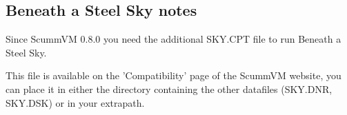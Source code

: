 \subsection{Beneath a Steel Sky notes}
Since ScummVM 0.8.0 you need the additional SKY.CPT file to run Beneath a 
Steel Sky.

This file is available on the 'Compatibility' page of the ScummVM
website, you can place it in either the directory containing the other
datafiles (SKY.DNR, SKY.DSK) or in your extrapath.
